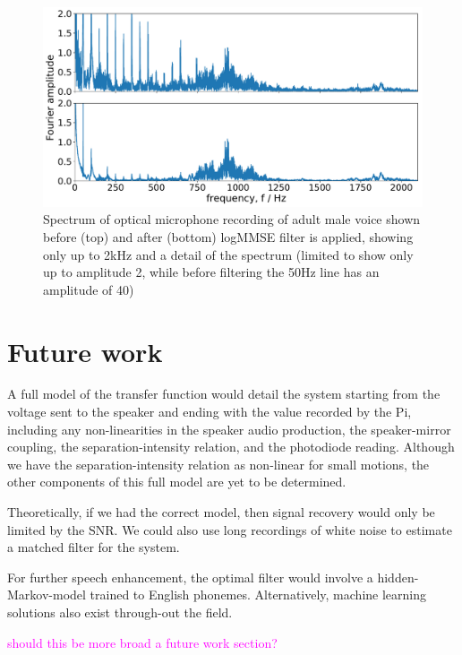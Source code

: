 \documentclass[prb,preprint]{revtex4-1}
\newcommand{\jam}{\textcolor{magenta}}
\begin{document}
\begin{figure}%
	\includegraphics[width=\textwidth]{figures/filter_spectrum_aa_melatos-cropped.pdf}
	\caption{Spectrum of optical microphone recording of adult male voice shown before (top) and after (bottom) logMMSE filter is applied, showing only up to 2kHz and a detail of the spectrum (limited to show only up to amplitude 2, while before filtering the 50Hz line has an amplitude of 40)}
	\label{fig:logMMSE_spectrum}
\end{figure}


\section{Future work}

A full model of the transfer function would detail the system starting from the voltage sent to the speaker and ending with the value recorded by the Pi, including any non-linearities in the speaker audio production, the speaker-mirror coupling, the separation-intensity relation, and the photodiode reading. Although we have the separation-intensity relation as non-linear for small motions, the other components of this full model are yet to be determined.


Theoretically, if we had the correct model, then signal recovery would only be limited by the SNR. We could also use long recordings of white noise to estimate a matched filter for the system.


For further speech enhancement, the optimal filter would involve a hidden-Markov-model trained to English phonemes. Alternatively, machine learning solutions also exist through-out the field.


\jam{should this be more broad a future work section?}
\end{document}
